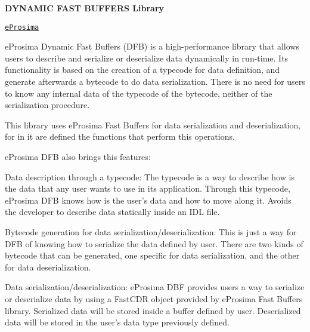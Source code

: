 \begin{center}{\bfseries D\-Y\-N\-A\-M\-I\-C F\-A\-S\-T B\-U\-F\-F\-E\-R\-S Library}\end{center} \par




\par
\begin{center}\href{http://www.eprosima.com}{\tt e\-Prosima}\end{center} 

e\-Prosima Dynamic Fast Buffers (D\-F\-B) is a high-\/performance library that allows users to describe and serialize or deserialize data dynamically in run-\/time. Its functionality is based on the creation of a typecode for data definition, and generate afterwards a bytecode to do data serialization. There is no need for users to know any internal data of the typecode of the bytecode, neither of the serialization procedure.

This library uses e\-Prosima Fast Buffers for data serialization and deserialization, for in it are defined the functions that perform this operations.

e\-Prosima D\-F\-B also brings this features\-:

\begin{DoxyItemize}
\item Data description through a typecode\-: The typecode is a way to describe how is the data that any user wants to use in its application. Through this typecode, e\-Prosima D\-F\-B knows how is the user's data and how to move along it. Avoids the developer to describe data statically inside an I\-D\-L file. \item Bytecode generation for data serialization/deserialization\-: This is just a way for D\-F\-B of knowing how to serialize the data defined by user. There are two kinds of bytecode that can be generated, one specific for data serialization, and the other for data deserialization. \item Data serialization/deserialization\-: e\-Prosima D\-B\-F provides users a way to serialize or deserialize data by using a Fast\-C\-D\-R object provided by e\-Prosima Fast Buffers library. Serialized data will be stored inside a buffer defined by user. Deserialized data will be stored in the user's data type previously defined. \end{DoxyItemize}
